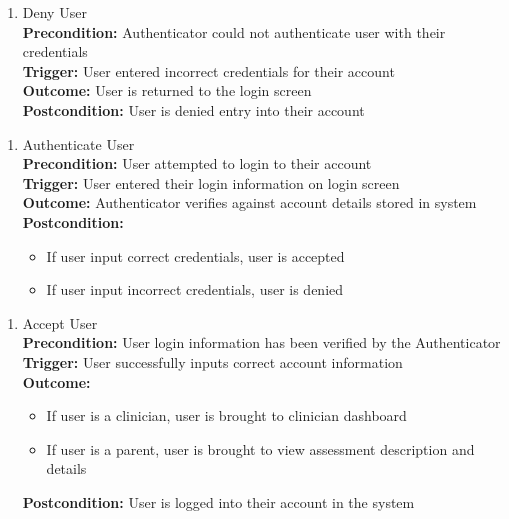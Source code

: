 \documentclass[12pt]{article}
\begin{document}
\begin{enumerate}[{PUC-}06. ]
  \item Deny User\\
  \textbf{Precondition: }Authenticator could not authenticate user with their credentials\\
  \textbf{Trigger: }User entered incorrect credentials for their account\\
  \textbf{Outcome: }User is returned to the login screen\\
  \textbf{Postcondition: }User is denied entry into their account\\
\end{enumerate}

\begin{enumerate}[{PUC-}07. ]
  \item Authenticate User\\
  \textbf{Precondition: }User attempted to login to their account\\
  \textbf{Trigger: }User entered their login information on login screen\\
  \textbf{Outcome: }Authenticator verifies against account details stored in system\\
  \textbf{Postcondition: }
  \begin{itemize}
    \item If user input correct credentials, user is accepted
    \item If user input incorrect credentials, user is denied
  \end{itemize}
\end{enumerate}

\begin{enumerate}[{PUC-}08. ]
  \item Accept User\\
  \textbf{Precondition: }User login information has been verified by the Authenticator\\
  \textbf{Trigger: }User successfully inputs correct account information\\
  \textbf{Outcome: }
  \begin{itemize}
    \item If user is a clinician, user is brought to clinician dashboard
    \item If user is a parent, user is brought to view assessment description and details
  \end{itemize}
\textbf{Postcondition: }User is logged into their account in the system\\
\end{enumerate}
\end{document}
